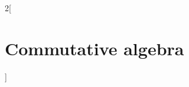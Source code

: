 \documentclass[../../../main_math.tex]{subfiles}
\begin{document}
\renewcommand{\col}{\alg}
\begin{multicols}{2}[\section{Commutative algebra}]

\end{multicols}
\end{document}
